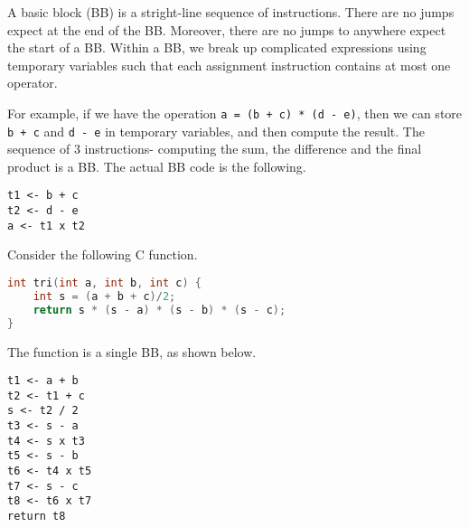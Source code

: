 \documentclass[a4paper, openany]{memoir}
\begin{document}
A basic block (BB) is a stright-line sequence of instructions. There are no jumps expect at the end of the BB. Moreover, there are no jumps to anywhere expect the start of a BB. Within a BB, we break up complicated expressions using temporary variables such that each assignment instruction contains at most one operator. 

For example, if we have the operation \texttt{a = (b + c) * (d - e)}, then we can store \texttt{b + c} and \texttt{d - e} in temporary variables, and then compute the result. The sequence of 3 instructions- computing the sum, the difference and the final product is a BB.
The actual BB code is the following.
\begin{lstlisting}
t1 <- b + c
t2 <- d - e
a <- t1 x t2
\end{lstlisting}

Consider the following C function.
\begin{lstlisting}[language=C]
int tri(int a, int b, int c) {
    int s = (a + b + c)/2;
    return s * (s - a) * (s - b) * (s - c);
}
\end{lstlisting}
The function is a single BB, as shown below.
\begin{lstlisting}
t1 <- a + b
t2 <- t1 + c
s <- t2 / 2
t3 <- s - a
t4 <- s x t3
t5 <- s - b
t6 <- t4 x t5
t7 <- s - c
t8 <- t6 x t7
return t8
\end{lstlisting}
\end{document}
